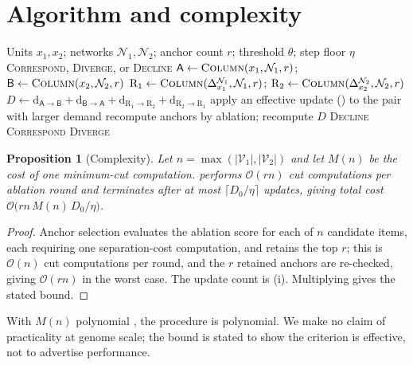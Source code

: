 \documentclass[11pt,twocolumn,a4paper]{article}
\newtheorem{proposition}[theorem]{Proposition}
\theoremstyle{definition}
\theoremstyle{remark}
\newcommand{\V}{\mathcal{V}}
\newcommand{\dem}{\mathrm{d}}
\newcommand{\colA}{\mathsf{A}}
\newcommand{\colB}{\mathsf{B}}
\newcommand{\Resp}{\mathrm{R}}
\newcommand{\bigO}{\mathcal{O}}
\newcommand{\netw}{\mathcal{N}}
\newcommand{\Perturb}{\Delta}
\begin{document}
\section{Algorithm and complexity}
\label{sec:algorithm}

\begin{algorithm}[t]
\caption{Four-column alignment.}
\label{alg:four}
\begin{algorithmic}[1]
\Require Units $x_1,x_2$; networks $\netw_1,\netw_2$; anchor count $r$;
threshold $\theta$; step floor $\eta$
\Ensure \textsc{Correspond}, \textsc{Diverge}, or \textsc{Decline}
\State $\colA\gets\Call{Column}{x_1,\netw_1,r}$;\quad
       $\colB\gets\Call{Column}{x_2,\netw_2,r}$
\State $\Resp_1\gets\Call{Column}{\Perturb^{\netw_1}_{x_1},\netw_1,r}$;\quad
       $\Resp_2\gets\Call{Column}{\Perturb^{\netw_2}_{x_2},\netw_2,r}$
\State $D\gets\dem_{\colA\to\colB}+\dem_{\colB\to\colA}
       +\dem_{\Resp_1\to\Resp_2}+\dem_{\Resp_2\to\Resp_1}$
  \State apply an effective update () to the pair with
         larger demand
  \State recompute anchors by ablation; recompute $D$
     \State \Return \textsc{Decline} 
  \EndIf
\EndWhile
{}
  \State \Return \textsc{Correspond}
\Else
  \State \Return \textsc{Diverge}
\EndIf
\end{algorithmic}
\end{algorithm}

\begin{proposition}[Complexity]
\label{prop:complexity}
Let $n=\max(|\V_1|,|\V_2|)$ and let $M(n)$ be the cost of one minimum-cut
computation.  performs $\bigO(rn)$ cut computations per
ablation round and terminates after at most $\lceil D_0/\eta\rceil$
updates, giving total cost
$\bigO\bigl(rn\,M(n)\,D_0/\eta\bigr)$.
\end{proposition}

\begin{proof}
Anchor selection evaluates the ablation score for each of $n$ candidate
items, each requiring one separation-cost computation, and retains the top
$r$; this is $\bigO(n)$ cut computations per round, and the $r$ retained
anchors are re-checked, giving $\bigO(rn)$ in the worst case. The update
count is (i). Multiplying gives the stated bound.
\end{proof}

With $M(n)$ polynomial \citep{stoer1997}, the procedure is polynomial. We
make no claim of practicality at genome scale; the bound is stated to show
the criterion is effective, not to advertise performance.
\end{document}
